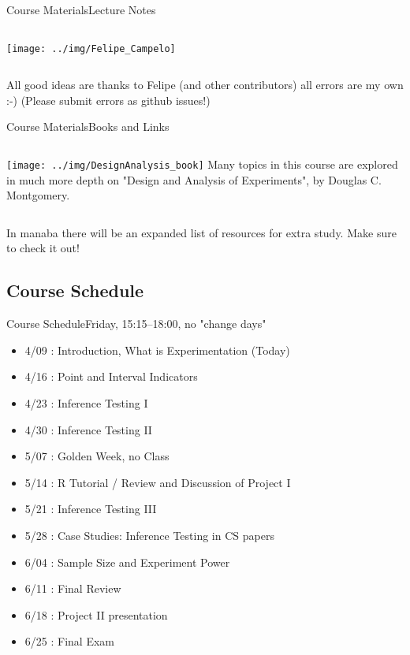 \documentclass{beamer}
\begin{document}
\begin{CJK}{UTF8}{ipxm}
\begin{frame}{Course Materials}{Lecture Notes}
\begin{columns}
    \hfill\texttt{[image: ../img/Felipe\_Campelo]}
  \end{columns}
  \vspace{1cm}

  All good ideas are thanks to Felipe (and other contributors) all errors are my own :-) (Please submit errors as github issues!)
\end{frame}

\begin{frame}{Course Materials}{Books and Links}
  \begin{columns}
    \texttt{[image: ../img/DesignAnalysis\_book]}
    Many topics in this course are explored in much more depth on "Design and Analysis of Experiments", by Douglas C. Montgomery.
  \end{columns}
  \vspace{1cm}

  In manaba there will be an expanded list of resources for
  extra study. Make sure to check it out!
\end{frame}



\subsection{Course Schedule}
\begin{frame}{Course Schedule}{Friday, 15:15--18:00, no "change days"}
\begin{itemize}
  \item 4/09 : Introduction, What is Experimentation (Today)
  \item 4/16 : Point and Interval Indicators
  \item 4/23 : Inference Testing I
  \item 4/30 : Inference Testing II
  \item \alert{5/07 : Golden Week, no Class}
  \item 5/14 : R Tutorial / Review and Discussion of Project I
  \item 5/21 : Inference Testing III
  \item 5/28 : Case Studies: Inference Testing in CS papers
  \item 6/04 : Sample Size and Experiment Power
  \item 6/11 : Final Review
  \item 6/18 : Project II presentation
  \item 6/25 : \alert{Final Exam}
\end{itemize}
\end{frame}


\end{CJK}
\end{document}
